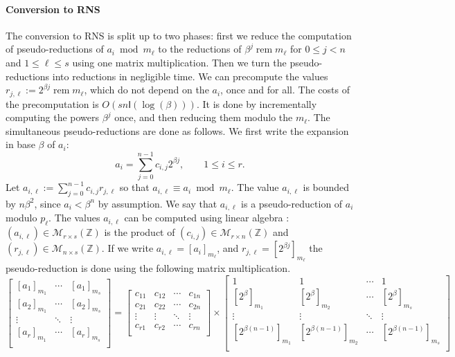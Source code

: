 \documentclass[acmtoms]{acmsmall}
\def\Z{\mathbb{Z}}
\def\I{\mathsf{I}}
\def\Mat{\mathcal{M}}
\newcommand{\tmop}[1]{\ensuremath{\operatorname{#1}}}
\newcommand{\assign}{:=}
\newcommand{\rem}{\tmop{rem}}
\begin{document}
\paragraph{Conversion to RNS}
The conversion to RNS is split up to two phases: first we reduce the computation of 
pseudo-reductions of $a_i \bmod m_\ell $ to the reductions of $\beta^j \rem m_\ell$ for
$0 \leqslant j < n$ and $1 \leqslant \ell \leqslant s$ using one matrix
multiplication. Then we turn the pseudo-reductions into reductions in 
negligible time. We can precompute the values
$r_{j, \ell} \assign 2^{\beta j} \rem m_\ell$, which do not depend on the $a_i$, once and for all.  
The costs of the precomputation is $O( sn \I (\log (\beta)))$. It is done by incrementally 
computing the powers $\beta^j$ once, and then reducing them modulo the $m_\ell$. The simultaneous 
pseudo-reductions are done as follows. We first write the expansion in base $\beta$ of $a_i$:
\[ a_i = \sum_{j = 0}^{n - 1} c_{i,j} 2^{\beta j}, \qquad 1 \leqslant i \leqslant r. \] 
Let $a_{i, \ell} \assign \sum_{j = 0}^{n - 1} c_{i, j} r_{j, \ell}$ so that 
$a_{i, \ell} \equiv a_i \bmod m_{\ell}$. The value $a_{i, \ell} $ is bounded by
$n \beta^2$, since $a_i < \beta^n$ by assumption. We say that $a_{i, \ell}$ is a
pseudo-reduction of $a_i$ modulo $p_{\ell}$.
The values $a_{i, \ell}$ can be computed using linear algebra :
$(a_{i, \ell}) \in \Mat_{r \times s} (\Z)$ is the product of
$(c_{i, j}) \in \Mat_{r \times n} (\Z)$ and
$(r_{j, \ell}) \in \Mat_{n \times s} (\Z)$. If we write $a_{i, \ell} = [a_i]_{m_\ell}$, and $r_{j, 
\ell} = [2^{\beta j}]_{m_\ell}$ the pseudo-reduction is done using the following matrix 
multiplication.
\[
\renewcommand{\arraystretch}{1.5}
\begin{bmatrix}
	[a_1]_{m_1} & \cdots & [a_1]_{m_s} \\
	[a_2]_{m_1} & \cdots & [a_2]_{m_s} \\
	\vdots & \ddots & \vdots \\
	[a_r]_{m_1} & \cdots & [a_r]_{m_s} \\
\end{bmatrix}
=
\begin{bmatrix}
	c_{11} & c_{12} & \cdots & c_{1n} \\
	c_{21} & c_{22} & \cdots & c_{2n} \\
	\vdots & \vdots & \ddots & \vdots \\
	c_{r1} & c_{r2} & \cdots & c_{rn} \\
\end{bmatrix}
\times
\begin{bmatrix}
	1 & 1 & \cdots & 1 \\
	[2^\beta]_{m_1} & [2^\beta]_{m_2} & \cdots & [2^\beta]_{m_s} \\
	\vdots & \vdots & \ddots & \vdots \\
	[2^{\beta(n - 1)}]_{m_1} & [2^{\beta(n - 1)}]_{m_2} & \cdots & [2^{\beta(n - 1)}]_{m_s} \\
\end{bmatrix}
\]
\end{document}
